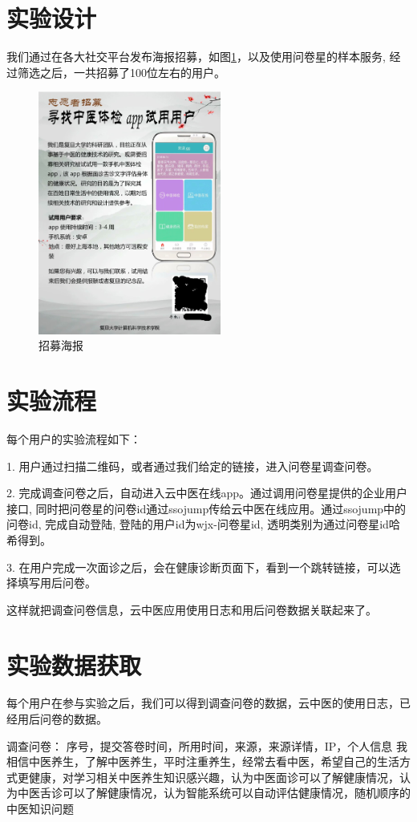 \section{实验设计}
我们通过在各大社交平台发布海报招募，如图\ref{fig:poster}，以及使用问卷星的样本服务, 经过筛选之后，一共招募了100位左右的用户。
\begin{figure}[htb]
    \centering
    \includegraphics[height=8cm]{images/poster.png}
    \caption{招募海报}
    \label{fig:poster}
\end{figure}
\section{实验流程}

每个用户的实验流程如下：

1. 用户通过扫描二维码，或者通过我们给定的链接，进入问卷星调查问卷。

2. 完成调查问卷之后，自动进入云中医在线app。通过调用问卷星提供的企业用户接口, 同时把问卷星的问卷id通过ssojump传给云中医在线应用。通过ssojump中的问卷id, 完成自动登陆, 登陆的用户id为wjx-{问卷星id}, 透明类别为通过问卷星id哈希得到。

3. 在用户完成一次面诊之后，会在健康诊断页面下，看到一个跳转链接，可以选择填写用后问卷。

这样就把调查问卷信息，云中医应用使用日志和用后问卷数据关联起来了。


\section{实验数据获取}
每个用户在参与实验之后，我们可以得到调查问卷的数据，云中医的使用日志，已经用后问卷的数据。

调查问卷： 序号，提交答卷时间，所用时间，来源，来源详情，IP，个人信息	我相信中医养生，了解中医养生，平时注重养生，经常去看中医，希望自己的生活方式更健康，对学习相关中医养生知识感兴趣，认为中医面诊可以了解健康情况，认为中医舌诊可以了解健康情况，认为智能系统可以自动评估健康情况，随机顺序的中医知识问题

